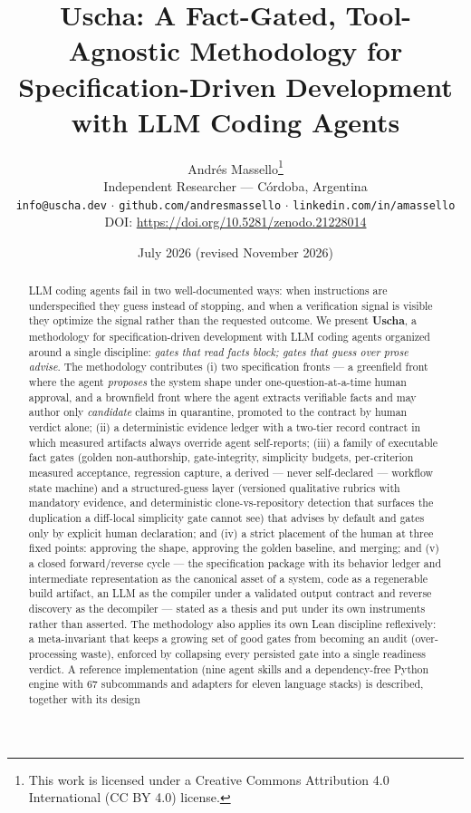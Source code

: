 \documentclass[11pt]{article}
\title{\textbf{Uscha: A Fact-Gated, Tool-Agnostic Methodology for\\Specification-Driven Development with LLM Coding Agents}}
\author{Andr\'es Massello\thanks{This work is licensed under a Creative
Commons Attribution 4.0 International (CC BY 4.0) license.}\\
\small Independent Researcher --- C\'ordoba, Argentina\\
\small \texttt{info@uscha.dev} $\cdot$ \texttt{github.com/andresmassello}
$\cdot$ \texttt{linkedin.com/in/amassello}\\
\small DOI: \url{https://doi.org/10.5281/zenodo.21228014}}
\date{July 2026 (revised November 2026)}
\begin{document}
\maketitle

\begin{abstract}
LLM coding agents fail in two well-documented ways: when instructions are
underspecified they guess instead of stopping, and when a verification signal is
visible they optimize the signal rather than the requested outcome. We present
\textbf{Uscha}, a methodology for specification-driven development with LLM
coding agents organized around a single discipline: \emph{gates that read facts
block; gates that guess over prose advise}. The methodology contributes (i) two
specification fronts --- a greenfield front where the agent \emph{proposes} the
system shape under one-question-at-a-time human approval, and a brownfield front
where the agent extracts verifiable facts and may author only \emph{candidate}
claims in quarantine, promoted to the contract by human verdict alone; (ii) a deterministic evidence ledger with a
two-tier record contract in which measured artifacts always override agent
self-reports; (iii) a family of executable fact gates (golden non-authorship,
gate-integrity, simplicity budgets, per-criterion measured acceptance,
regression capture, a derived --- never self-declared --- workflow state machine)
and a structured-guess layer (versioned qualitative rubrics with mandatory
evidence, and deterministic clone-vs-repository detection that surfaces the
duplication a diff-local simplicity gate cannot see) that advises by default and
gates only by explicit human declaration; and (iv) a strict placement of the
human at three fixed points: approving the shape, approving the golden baseline,
and merging; and (v) a closed forward/reverse cycle --- the specification package
with its behavior ledger and intermediate representation as the canonical asset of
a system, code as a regenerable build artifact, an LLM as the compiler under a
validated output contract and reverse discovery as the decompiler --- stated as a
thesis and put under its own instruments rather than asserted. The methodology also applies its own Lean discipline reflexively:
a meta-invariant that keeps a growing set of good gates from becoming an audit
(over-processing waste), enforced by collapsing every persisted gate into a
single readiness verdict. A reference implementation (nine agent skills and a
dependency-free Python engine with 67 subcommands and adapters for eleven language
stacks) is described, together with its design

\end{abstract}
\end{document}
